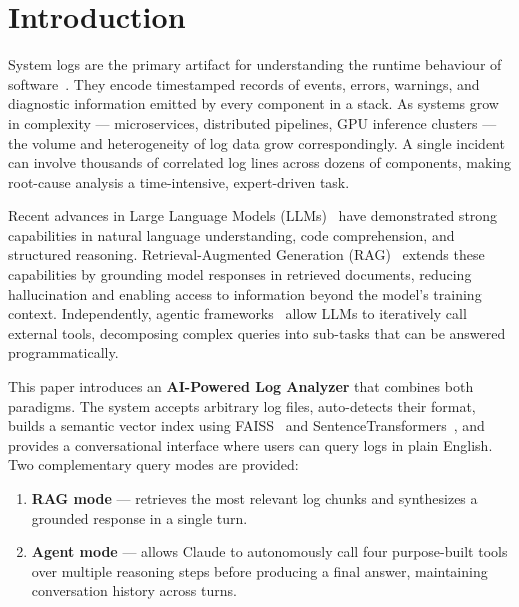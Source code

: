 \documentclass[runningheads]{llncs}
\begin{document}
\section{Introduction}
\label{sec:intro}

System logs are the primary artifact for understanding the runtime behaviour
of software~\cite{he2017drain}. They encode timestamped records of events,
errors, warnings, and diagnostic information emitted by every component in a
stack. As systems grow in complexity --- microservices, distributed pipelines,
GPU inference clusters --- the volume and heterogeneity of log data grow
correspondingly. A single incident can involve thousands of correlated log
lines across dozens of components, making root-cause analysis a
time-intensive, expert-driven task.

Recent advances in Large Language Models (LLMs)~\cite{brown2020gpt3}
have demonstrated strong capabilities in natural language understanding,
code comprehension, and structured reasoning.
Retrieval-Augmented Generation (RAG)~\cite{lewis2020rag} extends these
capabilities by grounding model responses in retrieved documents, reducing
hallucination and enabling access to information beyond the model's training
context. Independently, agentic frameworks~\cite{yao2023react,
schick2023toolformer} allow LLMs to iteratively call external tools,
decomposing complex queries into sub-tasks that can be answered
programmatically.

This paper introduces an \textbf{AI-Powered Log Analyzer} that combines
both paradigms. The system accepts arbitrary log files, auto-detects their
format, builds a semantic vector index using FAISS~\cite{johnson2019faiss}
and SentenceTransformers~\cite{reimers2019sentencebert}, and provides a
conversational interface where users can query logs in plain English. Two
complementary query modes are provided:
\begin{enumerate}
  \item \textbf{RAG mode} --- retrieves the most relevant log chunks and
        synthesizes a grounded response in a single turn.
  \item \textbf{Agent mode} --- allows Claude to autonomously call four
        purpose-built tools over multiple reasoning steps before producing
        a final answer, maintaining conversation history across turns.
\end{enumerate}
\end{document}
